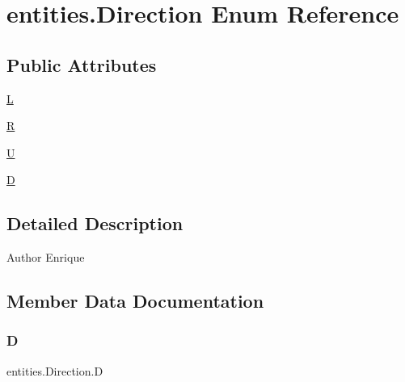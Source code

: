 \hypertarget{enumentities_1_1_direction}{}\section{entities.\+Direction Enum Reference}
\label{enumentities_1_1_direction}
\subsection*{Public Attributes}
\begin{DoxyCompactItemize}
\item 
\mbox{\hyperlink{enumentities_1_1_direction_a4de19aec218632f6a0e7be4a789587c1}{L}}
\item 
\mbox{\hyperlink{enumentities_1_1_direction_a01d620c1e04dc5d8009cbf0e948e5eac}{R}}
\item 
\mbox{\hyperlink{enumentities_1_1_direction_a34c178cb3cfe3462dc5d953e911cdf28}{U}}
\item 
\mbox{\hyperlink{enumentities_1_1_direction_aa2ca6e3c59c6a5263f4a42dfe24f4ec0}{D}}
\end{DoxyCompactItemize}


\subsection{Detailed Description}
\begin{DoxyAuthor}{Author}
Enrique 
\end{DoxyAuthor}


\subsection{Member Data Documentation}
\mbox{\label{enumentities_1_1_direction_aa2ca6e3c59c6a5263f4a42dfe24f4ec0}} 
\subsubsection{\texorpdfstring{D}{D}}
{\footnotesize\ttfamily entities.\+Direction.\+D}

\mbox{\label{enumentities_1_1_direction_a4de19aec218632f6a0e7be4a789587c1}} 

